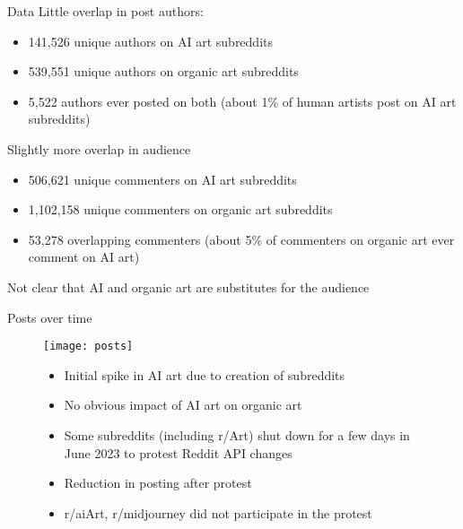 \documentclass[aspectratio=169]{beamer}
\def\defaultscalefig{0.4}
\begin{document}
\begin{frame}{Data}
Little overlap in post authors:
	\begin{itemize}
		\item 141,526 unique authors on AI art subreddits
		\item 539,551 unique authors on organic art subreddits
		\item 5,522 authors ever posted on both
			(about 1\% of human artists post on AI art subreddits)
	\end{itemize}
Slightly more overlap in audience
	\begin{itemize}
		\item 506,621 unique commenters on AI art subreddits
		\item 1,102,158 unique commenters on organic art subreddits
		\item 53,278 overlapping commenters
			(about 5\% of commenters on organic art ever comment on AI art)
	\end{itemize}
Not clear that AI and organic art are substitutes for the audience
\end{frame}

\begin{frame}{Posts over time}
	\begin{figure}
		\begin{minipage}{0.45\textwidth}
			\centering
			\texttt{[image: posts]}
		\end{minipage}\hfill
		\begin{minipage}{0.45\textwidth}
			\centering
			\begin{itemize}
				\item Initial spike in AI art due to creation of subreddits
				\item No obvious impact of AI art on organic art
				\item Some subreddits (including r/Art) shut down for a few days in June 2023 to protest Reddit API changes
				\item Reduction in posting after protest
				\item r/aiArt, r/midjourney did not participate in the protest
			\end{itemize}
		\end{minipage}
	\end{figure}
\end{frame}
\end{document}
